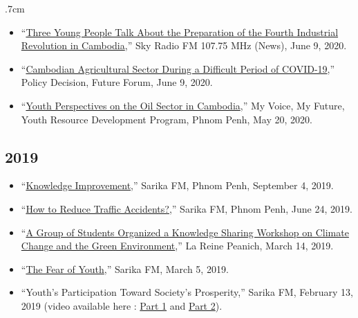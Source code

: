 \documentclass[10pt,a4paper]{article}
\begin{document}
\begin{adjustwidth}{.7cm}{}
\begin{itemize}[label={},itemindent=-2em,leftmargin=2em]
			\item ``\href{https://www.skyradiokh.com/d/139214}{Three Young People Talk About the Preparation of the Fourth Industrial Revolution in Cambodia},” Sky Radio FM 107.75 MHz (News), June 9, 2020.
			
			\item ``\href{https://www.facebook.com/FutureForumAsia/videos/836714263404226}{Cambodian Agricultural Sector During a Difficult Period of COVID-19},” Policy Decision, Future Forum, June 9, 2020.
			
			\item ``\href{https://www.facebook.com/yrdpcambodiapage/videos/2875876895973356}{Youth Perspectives on the Oil Sector in Cambodia},” My Voice, My Future, Youth Resource Development Program, Phnom Penh, May 20, 2020. 
			
		\end{itemize}
		
	\subsection*{2019}
		\begin{itemize}[label={},itemindent=-2em,leftmargin=2em]
				
			\item “\href{https://www.facebook.com/SarikaFM/videos/681602885694436}{Knowledge Improvement},” Sarika FM, Phnom Penh, September 4, 2019. 
			
			\item “\href{https://www.facebook.com/SarikaFM/videos/352213152129788}{How to Reduce Traffic Accidents?},” Sarika FM, Phnom Penh, June 24, 2019. 
				
			\item “\href{https://www.lareine.com.kh/news/pr/38371/}{A Group of Students Organized a Knowledge Sharing Workshop on Climate Change and the Green Environment},” La Reine Peanich, March 14, 2019.
					
			\item “\href{https://www.facebook.com/SarikaFM/videos/577713829370931}{The Fear of Youth},” Sarika FM, March 5, 2019. 
						
			\item “Youth’s Participation Toward Society’s Prosperity,” Sarika FM, February 13, 2019 (video available here : \href{https://www.facebook.com/SarikaFM/videos/370794163739835}{Part 1} and \href{https://www.facebook.com/SarikaFM/videos/251588595754580}{Part 2}).
		\end{itemize}
	

\end{adjustwidth}
\end{document}
